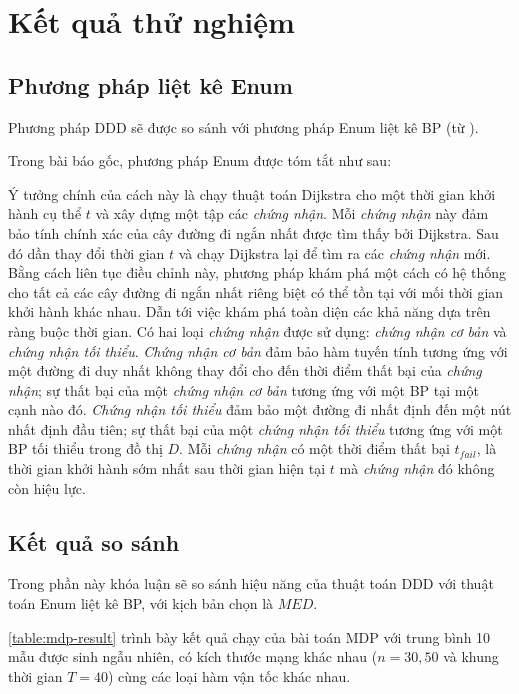 \documentclass[../main.tex]{subfiles}
\begin{document}
\section{Kết quả thử nghiệm}\label{nhux1eefng-lux1ee3i-uxedch-cux1ee7a-ddd}

\subsection{Phương pháp liệt kê Enum}\label{phuong-phap-enum}
Phương pháp DDD sẽ được so sánh với phương pháp Enum liệt kê BP (từ \cite{foschini2011complexity}).

Trong bài báo gốc, phương pháp Enum được tóm tắt như sau: 

Ý tưởng chính của cách này là chạy thuật toán Dijkstra cho một thời gian khởi hành cụ thể \(t\)
và xây dựng một tập các \emph{chứng nhận}. Mỗi \emph{chứng nhận} này đảm bảo tính chính xác của cây đường đi ngắn nhất được tìm thấy bởi Dijkstra.
Sau đó dần thay đổi thời gian \(t\) và chạy Dijkstra lại để tìm ra các \emph{chứng nhận} mới. Bằng cách liên tục điều chỉnh này, phương pháp khám phá
một cách có hệ thống cho tất cả các cây đường đi ngắn nhất riêng biệt có thể tồn tại với mối thời gian khởi hành khác nhau. 
Dẫn tới việc khám phá toàn diện các khả năng dựa trên ràng buộc thời gian.
Có hai loại \emph{chứng nhận} được sử dụng: \emph{chứng nhận cơ bản} và \emph{chứng nhận tối thiểu}. \emph{Chứng nhận cơ bản} đảm bảo hàm tuyến tính tương ứng với một đường đi duy nhất không thay đổi cho đến thời điểm thất bại của \emph{chứng nhận}; 
sự thất bại của một \emph{chứng nhận cơ bản} tương ứng với một BP tại một cạnh nào đó.
\emph{Chứng nhận tối thiểu} đảm bảo một đường đi nhất định đến một nút nhất định đầu tiên; sự thất bại của một \emph{chứng nhận tối thiểu} tương ứng với một BP tối thiểu trong đồ thị \(D\).
Mỗi \emph{chứng nhận} có một thời điểm thất bại \(t_{fail}\), là thời gian khởi hành sớm nhất sau thời gian hiện tại \(t\) mà \emph{chứng nhận} đó không còn hiệu lực.


\subsection{Kết quả so sánh}\label{ket-qua-so-sanh}

Trong phần này khóa luận sẽ so sánh hiệu năng của thuật toán DDD với thuật
toán Enum liệt kê BP, với kịch bản chọn là \(MED\).



\autoref{table:mdp-result} trình bày kết quả chạy của bài toán MDP với trung bình 10 mẫu được sinh ngẫu
nhiên, có kích thước mạng khác nhau (\(n=30,50\) và khung thời gian
\(T=40\)) cùng các loại hàm vận tốc khác nhau.
\end{document}
